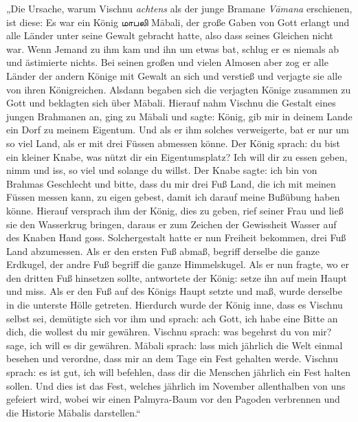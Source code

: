 \documentclass{article}
\newcommand{\TamilText}[1]{\texttamil{#1}}
\newcommand{\tam}[1]{\TamilText{#1}}
\begin{document}
„Die Ursache, warum Vischnu \emph{achtens} als der junge Bramane \emph{V\={a}mana} erschienen, ist diese: Es war ein König \tam{மாபலி} M\={a}bali, der große Gaben von Gott erlangt und alle Länder unter seine Gewalt gebracht hatte, also dass seines Gleichen nicht war. Wenn Jemand zu ihm kam und ihn um etwas bat, schlug er es niemals ab und ästimierte nichts. Bei seinen großen und vielen Almosen aber zog er alle Länder der andern Könige mit Gewalt an sich und verstieß und verjagte sie alle von ihren Königreichen. Alsdann begaben sich die verjagten Könige zusammen zu Gott und beklagten sich über M\={a}bali. Hierauf nahm Vischnu die Gestalt eines jungen Brahmanen an, ging zu M\={a}bali und sagte: König, gib mir in deinem Lande ein Dorf zu meinem Eigentum. Und als er ihm solches verweigerte, bat er nur um so viel Land, als er mit drei Füssen abmessen könne. Der König sprach: du bist ein kleiner Knabe, was nützt dir ein Eigentumsplatz? Ich will dir zu essen geben, nimm und iss, so viel und solange du willst. Der Knabe sagte: ich bin von Brahmas Geschlecht und bitte, dass du mir drei Fuß Land, die ich mit meinen Füssen messen kann, zu eigen gebest, damit ich darauf meine Bußübung haben könne. Hierauf versprach ihm der König, dies zu geben, rief seiner Frau und ließ sie den Wasserkrug bringen, daraus er zum Zeichen der Gewissheit Wasser auf des Knaben Hand goss. Solchergestalt hatte er nun Freiheit bekommen, drei Fuß Land abzumessen. Als er den ersten Fuß abmaß, begriff derselbe die ganze Erdkugel, der andre Fuß begriff die ganze Himmelskugel. Als er nun fragte, wo er den dritten Fuß hinsetzen sollte, antwortete der König: setze ihn auf mein Haupt und miss. Als er den Fuß auf des Königs Haupt setzte und maß, wurde derselbe in die unterste Hölle getreten. Hierdurch wurde der König inne, dass es Vischnu selbst sei, demütigte sich vor ihm und sprach: ach Gott, ich habe eine Bitte an dich, die wollest du mir gewähren. Vischnu sprach: was begehrst du von mir? sage, ich will es dir gewähren. M\={a}bali sprach: lass mich jährlich die Welt einmal besehen und verordne, dass mir an dem Tage ein Fest gehalten werde. Vischnu sprach: es ist gut, ich will befehlen, dass dir die Menschen jährlich ein Fest halten sollen. Und dies ist das Fest, welches jährlich im November allenthalben von uns gefeiert wird, wobei wir einen Palmyra-Baum vor den Pagoden verbrennen und die Historie M\={a}balis darstellen.“
\end{document}
